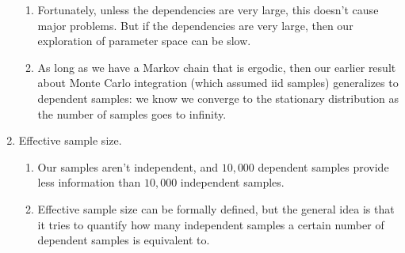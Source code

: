 \documentclass{article}
\begin{document}
\begin{enumerate}
\begin{enumerate}
	\item Fortunately, unless the dependencies are very large, this doesn't cause major problems.  But if the dependencies are very large, then our exploration of parameter space can be slow.  
	\item As long as we have a Markov chain that is ergodic, then our earlier result about Monte Carlo integration (which assumed iid samples) generalizes to dependent samples: we know we converge to the stationary distribution as the number of samples goes to infinity.  
	\end{enumerate}
\item Effective sample size.
	\begin{enumerate}
	\item Our samples aren't independent, and $10,000$ dependent samples provide less information than $10,000$ independent samples. 
	\item Effective sample size can be formally defined, but the general idea is that it tries to quantify how many independent samples a certain number of dependent samples is equivalent to.  
	\end{enumerate}
\end{enumerate}
\end{document}
